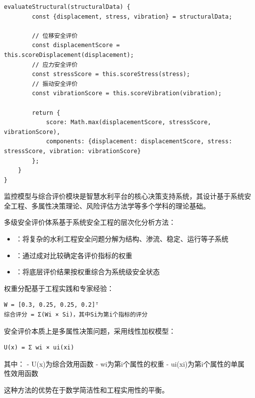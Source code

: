 \begin{lstlisting}[style=javascript]
    evaluateStructural(structuralData) {
        const {displacement, stress, vibration} = structuralData;
        
        // 位移安全评价
        const displacementScore = this.scoreDisplacement(displacement);
        // 应力安全评价  
        const stressScore = this.scoreStress(stress);
        // 振动安全评价
        const vibrationScore = this.scoreVibration(vibration);
        
        return {
            score: Math.max(displacementScore, stressScore, vibrationScore),
            components: {displacement: displacementScore, stress: stressScore, vibration: vibrationScore}
        };
    }
}
\end{lstlisting}


监控模型与综合评价模块是智慧水利平台的核心决策支持系统，其设计基于系统安全工程、多属性决策理论、风险评估方法学等多个学科的理论基础。


多级安全评价体系基于系统安全工程的层次化分析方法：

\begin{itemize}
\tightlist
\item
  ：将复杂的水利工程安全问题分解为结构、渗流、稳定、运行等子系统
\item
  ：通过成对比较确定各评价指标的权重
\item
  ：将底层评价结果按权重综合为系统级安全状态
\end{itemize}

权重分配基于工程实践和专家经验：

\begin{lstlisting}
W = [0.3, 0.25, 0.25, 0.2]ᵀ
综合评分 = Σ(Wi × Si)，其中Si为第i个指标的评分
\end{lstlisting}


安全评价本质上是多属性决策问题，采用线性加权模型：

\begin{lstlisting}
U(x) = Σ wi × ui(xi)
\end{lstlisting}

其中： - U(x)为综合效用函数 - wi为第i个属性的权重 - ui(xi)为第i个属性的单属性效用函数

这种方法的优势在于数学简洁性和工程实用性的平衡。


